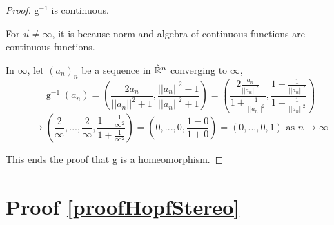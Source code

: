 \begin{proof}
g$^{-1}$ is continuous.

For $\vec{u}\neq \infty$, it is because norm and algebra of continuous functions are continuous functions.

In $\infty$, let $(a_n)_n$ be a sequence in $\hat{\mathbb{R}}^n$ converging to $\infty$,
\begin{equation*}
\operatorname{g}^{-1}(a_n) = \left( \frac{2a_n}{||a_n||^2+1}, \frac{||a_n||^2-1}{||a_n||^2+1} \right) = \left( \frac{2 \frac{a_n}{||a_n||^2}}{1 + \frac{1}{||a_n||^2}}, \frac{1-\frac{1}{||a_n||^2}}{1+\frac{1}{||a_n||^2}} \right)
\end{equation*}
\begin{equation*}
 \rightarrow \left( \frac{2}{\infty}, ..., \frac{2}{\infty}, \frac{1-\frac{1}{\infty^2}}{1+\frac{1}{\infty^2}} \right) = \left( 0, ..., 0, \frac{1-0}{1+0} \right) = (0, ..., 0, 1) \text{ as }n \rightarrow \infty    
\end{equation*}

This ends the proof that g is a homeomorphism.
\end{proof}


\section{Proof \ref{proofHopfStereo}}

